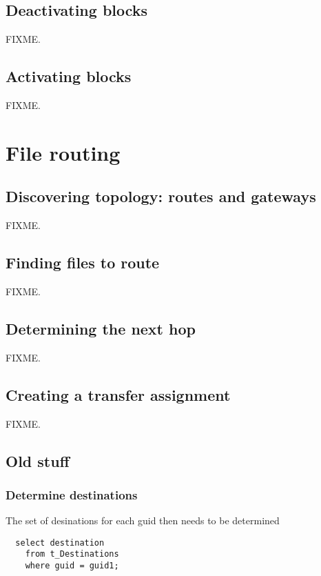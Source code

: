 \documentclass{cmspaper}
\begin{document}
\subsection{Deactivating blocks}

FIXME.

\subsection{Activating blocks}

FIXME.

\section{File routing}

\subsection{Discovering topology: routes and gateways}

FIXME.

\subsection{Finding files to route}

FIXME.

\subsection{Determining the next hop}

FIXME.

\subsection{Creating a transfer assignment}

FIXME.

\subsection{Old stuff}
\subsubsection{Determine destinations}
The set of desinations for each guid then needs to be determined

{\small\begin{verbatim}
  select destination
    from t_Destinations
    where guid = guid1;
\end{verbatim}}
\end{document}
